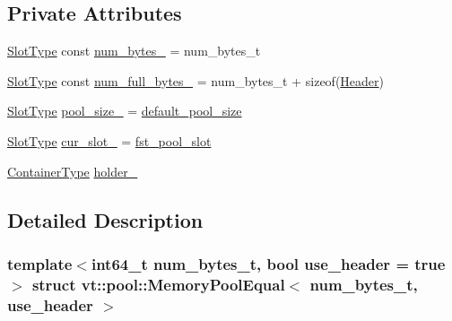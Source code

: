 \subsection*{Private Attributes}
\begin{DoxyCompactItemize}
\item 
\hyperlink{structvt_1_1pool_1_1_memory_pool_equal_af05a2c24c95c666b20e3758745be746b}{Slot\+Type} const \hyperlink{structvt_1_1pool_1_1_memory_pool_equal_a50e14945e15e2ab88319e347c2a3f1b7}{num\+\_\+bytes\+\_\+} = num\+\_\+bytes\+\_\+t
\item 
\hyperlink{structvt_1_1pool_1_1_memory_pool_equal_af05a2c24c95c666b20e3758745be746b}{Slot\+Type} const \hyperlink{structvt_1_1pool_1_1_memory_pool_equal_a70c83d8bfd3a1c0c8f2c1a4a27e2aa04}{num\+\_\+full\+\_\+bytes\+\_\+} = num\+\_\+bytes\+\_\+t + sizeof(\hyperlink{structvt_1_1pool_1_1_header}{Header})
\item 
\hyperlink{structvt_1_1pool_1_1_memory_pool_equal_af05a2c24c95c666b20e3758745be746b}{Slot\+Type} \hyperlink{structvt_1_1pool_1_1_memory_pool_equal_a25a2b249ba0983b65ec1e2877dbd4f19}{pool\+\_\+size\+\_\+} = \hyperlink{structvt_1_1pool_1_1_memory_pool_equal_a8daca02e94e9ab587670808525561c71}{default\+\_\+pool\+\_\+size}
\item 
\hyperlink{structvt_1_1pool_1_1_memory_pool_equal_af05a2c24c95c666b20e3758745be746b}{Slot\+Type} \hyperlink{structvt_1_1pool_1_1_memory_pool_equal_aeb14c73621125dc7d9179833bbc780a7}{cur\+\_\+slot\+\_\+} = \hyperlink{structvt_1_1pool_1_1_memory_pool_equal_a11e4d0dbd2ea5c1f93fa8cdf36c1e60a}{fst\+\_\+pool\+\_\+slot}
\item 
\hyperlink{structvt_1_1pool_1_1_memory_pool_equal_adfcfe5caf881b17d4c0355291c4f707f}{Container\+Type} \hyperlink{structvt_1_1pool_1_1_memory_pool_equal_a901b7dfe76a139d533e80fec478235c8}{holder\+\_\+}
\end{DoxyCompactItemize}


\subsection{Detailed Description}
\subsubsection*{template$<$int64\+\_\+t num\+\_\+bytes\+\_\+t, bool use\+\_\+header = true$>$\newline
struct vt\+::pool\+::\+Memory\+Pool\+Equal$<$ num\+\_\+bytes\+\_\+t, use\+\_\+header $>$}

